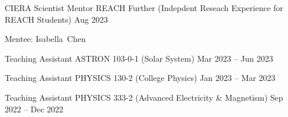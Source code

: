 


\begin{cventries}

\cvsimpentry
{CIERA Scientist Mentor}
{REACH Further (Indepdent Reseach Experience for REACH Students)}
{Aug 2023}
{\begin{cvitems}
	\item {Mentee: Isabella~Chen}
\end{cvitems}}

\cvsimpentry
{Teaching Assistant}
{ASTRON 103-0-1 (Solar System)}
{Mar 2023 -- Jun 2023}
{}

\cvsimpentry
{Teaching Assistant}
{PHYSICS 130-2 (College Physics)}
{Jan 2023 -- Mar 2023}
{}

\cvsimpentry
{Teaching Assistant}
{PHYSICS 333-2 (Advanced Electricity \& Magnetism)}
{Sep 2022 -- Dec 2022}
{}


\end{cventries}